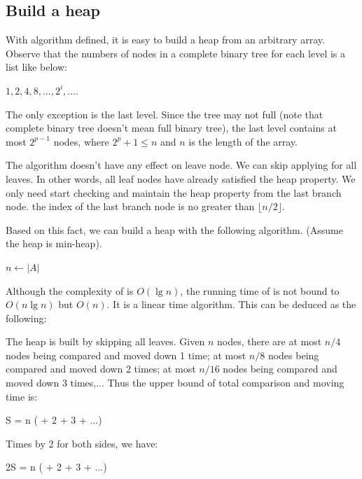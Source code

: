 \documentclass[b5paper]{article}
\begin{document}
\subsection{Build a heap}

With  algorithm defined, it is easy to build a heap from an arbitrary
array. Observe that the numbers of nodes in a complete binary tree
for each level is a list like below:

$1, 2, 4, 8, ..., 2^i, ...$.

The only exception is the last level. Since the tree may not full
(note that complete binary tree doesn't mean full binary tree), the
last level contains at most $2^{p-1}$ nodes, where $2^p + 1 \leq n$ and $n$
is the length of the array.

The  algorithm doesn't have any effect on leave node.
We can skip applying  for all leaves. In other words,
all leaf nodes have already satisfied the heap property. We only need
start checking and maintain the heap property from the last branch node.
the index of the last branch node is no greater than $\lfloor n/2 \rfloor$.

Based on this fact, we can build a heap with the following algorithm.
(Assume the heap is min-heap).

\begin{algorithmic}[1]
  \State $n \gets |A|$
    \State {}
  \EndFor
\EndFunction
\end{algorithmic}

Although the complexity of  is $O(\lg n)$, the running time
of  is not bound to $O(n \lg n)$ but $O(n)$. It
is a linear time algorithm. This can be deduced as the following:

The heap is built by skipping all leaves.
Given $n$ nodes, there are at most $n/4$ nodes being compared and moved down 1 time;
at most $n/8$ nodes being compared and moved down 2 times; at most $n/16$ nodes being
compared and moved down 3 times,... Thus the upper bound of total comparison and
moving time is:

\be
S = n ( + 2  + 3  + ...)
\label{eq:build-heap-1}
\ee

Times by 2 for both sides, we have:

\be
2S = n ( + 2  + 3  + ...)
\label{eq:build-heap-2}
\ee
\end{document}
